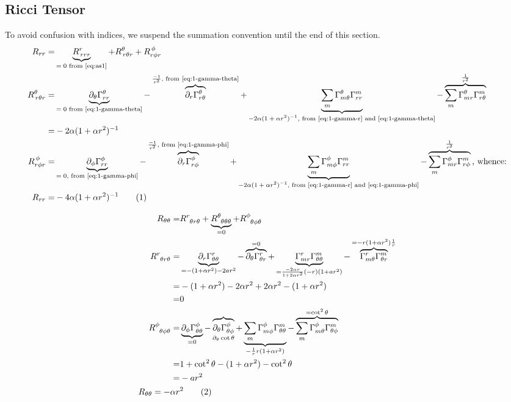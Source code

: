 \documentclass[]{article}
\newcommand\numberthis{\addtocounter{equation}{1}\tag{\theequation}}
\begin{document}
\subsection{Ricci Tensor}\label{section:ricci-1}
To avoid confusion with indices, we suspend the summation convention until the end of this section.
\begin{align*}
R_{rr}=&\underbrace{R^r_{\,rrr}}_\text{$=0$ from \eqref{eq:as1}}+R^{\theta}_{\,r\theta r}+R^{\,\phi}_{r\phi r}\\
R^{\theta}_{\,r\theta r}=&\underbrace{\partial_{\theta}\Gamma^{\theta}_{rr}}_\text{$=0$ from \eqref{eq:1-gamma-theta}}-\overbrace{\partial_r\Gamma^{\theta}_{r\theta}}^\text{$\frac{-1}{r^2}$, from \eqref{eq:1-gamma-theta}}+\underbrace{\sum_m\Gamma^{\theta}_{m\theta}\Gamma^{m}_{rr}}_\text{$-2 \alpha (1+\alpha r^2)^{-1}$, from \eqref{eq:1-gamma-r} and \eqref{eq:1-gamma-theta}}-\overbrace{\sum_m\Gamma^{\theta}_{mr}\Gamma^m_{r\theta}}^\text{$\frac{1}{r^2}$}\\
=&-2 \alpha (1+\alpha r^2)^{-1}\\
R^{\,\phi}_{r\phi r}=&\underbrace{\partial_{\phi}\Gamma^{\phi}_{rr}}_\text{$=0$, from \eqref{eq:1-gamma-phi}}-\overbrace{\partial_r\Gamma^{\phi}_{r\phi}}^\text{$\frac{-1}{r^2}$, from \eqref{eq:1-gamma-phi}}+\underbrace{\sum_m\Gamma^{\phi}_{m\phi}\Gamma^{m}_{rr}}_\text{$-2 \alpha (1+\alpha r^2)^{-1}$, from \eqref{eq:1-gamma-r} and \eqref{eq:1-gamma-phi}}-\overbrace{\sum_m\Gamma^{\phi}_{mr}\Gamma^m_{r\phi}}^\text{$\frac{1}{r^2}$}\text{, whence:}\\
R_{rr}=&-4 \alpha (1+\alpha r^2)^{-1}\numberthis\label{eq:R-r-r}
\end{align*}

\begin{align*}
R_{\theta\theta}=&R\indices{^r_{\theta r\theta}}+\underbrace{R\indices{^{\theta}_{\theta\theta\theta}}}_{=0}+R\indices{^{\phi}_{\theta\phi\theta}}\\
R\indices{^r_{\theta r\theta}}=&\underbrace{\partial_r\Gamma^r_{\theta\theta}}_{=-(1+\alpha r^2)-2ar^2}-\overbrace{\partial_\theta\Gamma^r_{\theta r}}^{=0}+\underbrace{\Gamma^r_{mr}\Gamma^m_{\theta\theta}}_{=\frac{-2\alpha r}{1+2\alpha r^2}(-r)(1+ar^2)}-\overbrace{\Gamma^r_{m\theta}\Gamma^m_{\theta r}}^{=-r(1+\alpha r^2)\frac{1}{r}}\\
=&-(1+\alpha r^2)-2\alpha r^2 + 2\alpha r^2-(1+\alpha r^2)\\
=&0\\
R\indices{^{\phi}_{\theta\phi\theta}}=&\underbrace{\partial_{\phi}\Gamma^{\phi}_{\theta\theta}}_{=0}-\overbrace{\partial_{\theta}\Gamma^{\phi}_{\theta\phi}}_{\partial_{\theta}\cot\theta}+\underbrace{\sum_m\Gamma^{\phi}_{m\phi}\Gamma^m_{\theta\theta}}_{-\frac{1}{r}r(1+\alpha r^2)}-\overbrace{\sum_m\Gamma^{\phi}_{m\theta}\Gamma^{m}_{\theta\phi}}^{=\cot^2\theta}\\
=&1+\cot^2\theta-(1+\alpha r^2)-\cot^2\theta\\
=&-ar^2\\
R_{\theta\theta} = -\alpha r&^2\numberthis\label{eq:R-theta-theta}
\end{align*}
\end{document}
